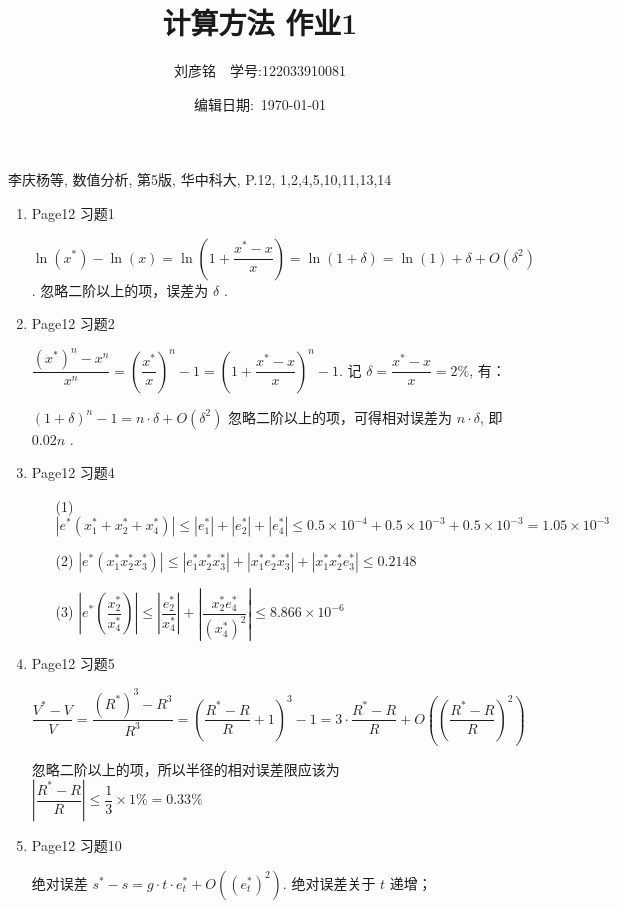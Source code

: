\documentclass{article}
\title{计算方法 作业1}
\author{刘彦铭\ \ 学号:122033910081}
\date{编辑日期:\ \today}
\begin{document}
\maketitle

李庆杨等, 数值分析, 第5版, 华中科大, P.12, 1,2,4,5,10,11,13,14

\begin{enumerate}
    \item Page12 习题1
    
    $\ln (x^*) - \ln (x) = \ln \left(1 + \dfrac{x^*-x}{x}\right) = \ln (1 + \delta) = \ln (1) + \delta + O(\delta^2) $.
    忽略二阶以上的项，误差为 $\delta$ .

    \item Page12 习题2
    
    $\dfrac{(x^*)^n - x^n}{x^n} = \left(\dfrac{x^*}{x}\right)^n - 1 = \left(1 + \dfrac{x^*-x}{x}\right)^n - 1$.
    记 $\delta = \dfrac{x^*-x}{x} = 2\%$, 有：
    
    $(1+\delta)^n - 1 = n\cdot \delta + O(\delta ^ 2)$ 忽略二阶以上的项，可得相对误差为 $n\cdot\delta$, 即 $0.02n$ .

    \item Page12 习题4
    
    \begin{enumerate}
        \item [(1)] $|e^*(x_1^*+x_2^*+x_4^*)| \leq  |e_1^*| + |e_2^*| + |e_4^*| \leq 0.5\times 10^{-4} + 0.5 \times 10 ^{-3} + 0.5 \times 10 ^{-3} = 1.05\times 10^{-3}$
        \item [(2)] $|e^*(x_1^*x_2^*x_3^*)| \leq |e_1^*x_2^*x_3^*| + |x_1^*e_2^*x_3^*| + |x_1^*x_2^*e_3^*| \leq 0.2148$
        \item [(3)] $\left|e^*\left(\dfrac{x_2^*}{x_4^*}\right)\right| \leq \left|\dfrac{e_2^*}{x_4^*}\right| + \left|\dfrac{x_2^*e_4^*}{(x_4^*)^2}\right| \leq 8.866 \times 10^{-6}$
    \end{enumerate}

    \item Page12 习题5

    $\dfrac{V^*-V}{V} = \dfrac{(R^*)^3 - R^3}{R^3} = \left(\dfrac{R^*-R}{R} + 1\right) ^ 3 - 1 = 3\cdot\dfrac{R^*-R}{R} + O\left(\left(\dfrac{R^*-R}{R}\right)^2\right)$

    忽略二阶以上的项，所以半径的相对误差限应该为 $|\dfrac{R^*-R}{R}|\leq \dfrac{1}{3}\times 1\% = 0.33\%$

    \item Page12 习题10 
    
    绝对误差 $s^* - s = g\cdot t\cdot e_t^* + O((e_t^*)^2)$. 绝对误差关于 $t$ 递增；


\end{enumerate}
\end{document}
